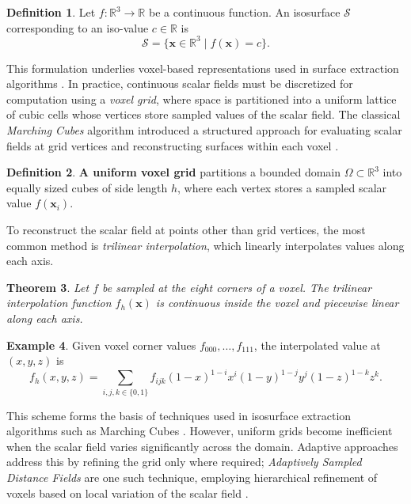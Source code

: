 \documentclass[12pt, a4paper, oneside]{book}
\theoremstyle{plain}
\newtheorem{theorem}{Theorem}[chapter]
\theoremstyle{definition}
\newtheorem{definition}[theorem]{Definition}
\newtheorem{example}[theorem]{Example}
\theoremstyle{remark}
\theoremstyle{definition}
\begin{document}
\begin{definition}
Let $f:\mathbb{R}^3 \rightarrow \mathbb{R}$ be a continuous function. An isosurface $\mathcal{S}$ corresponding to an iso-value $c \in \mathbb{R}$ is
\[
\mathcal{S} = \{ \mathbf{x} \in \mathbb{R}^3 \mid f(\mathbf{x}) = c \}.
\]
\end{definition}

This formulation underlies voxel-based representations used in surface extraction algorithms \cite{bloomenthal1997introduction,lorensen1998marching}. In practice, continuous scalar fields must be discretized for computation using a \emph{voxel grid}, where space is partitioned into a uniform lattice of cubic cells whose vertices store sampled values of the scalar field. The classical \emph{Marching Cubes} algorithm introduced a structured approach for evaluating scalar fields at grid vertices and reconstructing surfaces within each voxel \cite{lorensen1998marching}.

\begin{definition}
\textbf{A uniform voxel grid} partitions a bounded domain $\Omega \subset \mathbb{R}^3$ into
equally sized cubes of side length $h$, where each vertex stores a sampled scalar value $f(\mathbf{x}_i)$.
\end{definition}

To reconstruct the scalar field at points other than grid vertices, the most common method is \emph{trilinear interpolation}, which linearly interpolates values along each axis.

\begin{theorem}
Let $f$ be sampled at the eight corners of a voxel. The trilinear interpolation function $f_h(\mathbf{x})$ is continuous inside the voxel and piecewise linear along each axis.
\end{theorem}

\begin{example}
    Given voxel corner values $f_{000}, \dots, f_{111}$, the interpolated value at
    $(x,y,z)$ is
\[
f_h(x,y,z) = \sum_{i,j,k \in \{0,1\}} f_{ijk}(1-x)^{1-i}x^i(1-y)^{1-j}y^j
(1-z)^{1-k}z^k.
\]
\end{example}

This scheme forms the basis of techniques used in isosurface extraction algorithms such as Marching Cubes \cite{lorensen1998marching}. However, uniform grids become inefficient when the scalar field varies significantly across the domain. Adaptive approaches address this by refining the grid only where required; \emph{Adaptively Sampled Distance Fields} are one such technique, employing hierarchical refinement of voxels based on local variation of the scalar field \cite{frisken2000adaptively}.
\end{document}
